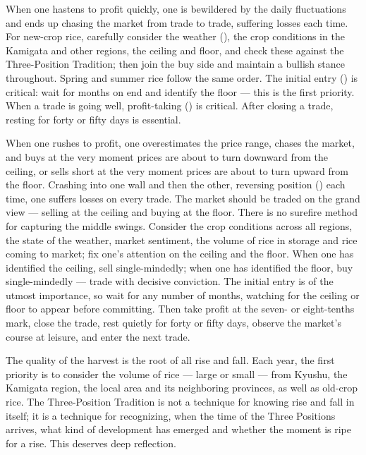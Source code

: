\begin{sokyubox}
{\small\itshape\color{sokyubar} }

\medskip
When one hastens to profit quickly, one is bewildered by the daily
fluctuations and ends up chasing the market from trade to trade,
suffering losses each time. For new-crop rice, carefully consider
the weather (), the crop conditions in the Kamigata
and other regions, the ceiling and floor, and check these against
the Three-Position Tradition; then join the buy side and maintain a
bullish stance throughout. Spring and summer rice follow the same
order. The initial entry () is critical: wait for
months on end and identify the floor --- this is the first
priority. When a trade is going well, profit-taking ()
is critical. After closing a trade, resting for forty or
fifty days is essential.
\end{sokyubox}

\commentary
When one rushes to profit, one overestimates the price range, chases
the market, and buys at the very moment prices are about to turn
downward from the ceiling, or sells short at the very moment prices
are about to turn upward from the floor. Crashing into one wall and
then the other, reversing position () each time, one
suffers losses on every trade. The market should be traded on the
grand view --- selling at the ceiling and buying at the floor.
There is no surefire method for capturing the middle swings.
Consider the crop conditions across all regions, the state of the
weather, market sentiment, the volume of rice in storage and rice
coming to market; fix one's attention on the ceiling and the floor.
When one has identified the ceiling, sell single-mindedly; when one
has identified the floor, buy single-mindedly --- trade with
decisive conviction. The initial entry is of the utmost importance,
so wait for any number of months, watching for the ceiling or floor
to appear before committing. Then take profit at the seven- or
eight-tenths mark, close the trade, rest quietly for forty or fifty
days, observe the market's course at leisure, and enter the next
trade.


\begin{sokyubox}
{\small\itshape\color{sokyubar} }

\medskip
The quality of the harvest is the root of all rise and fall. Each
year, the first priority is to consider the volume of rice ---
large or small --- from Kyushu, the Kamigata region, the local area
and its neighboring provinces, as well as old-crop rice. The
Three-Position Tradition is not a technique for knowing rise and fall
in itself; it is a technique for recognizing, when the time of the
Three Positions arrives, what kind of development has emerged and
whether the moment is ripe for a rise. This deserves deep
reflection.
\end{sokyubox}

